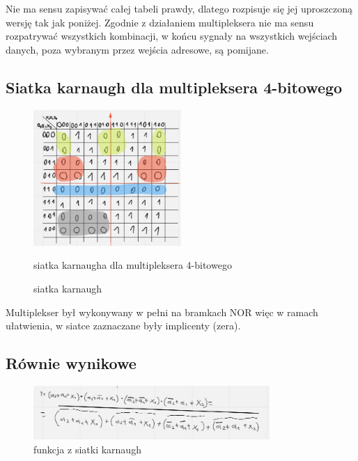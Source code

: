 Nie ma sensu zapisywać całej tabeli prawdy, dlatego rozpisuje się jej uproszczoną wersję tak jak poniżej. Zgodnie z działaniem multipleksera nie ma sensu rozpatrywać wszystkich kombinacji, w końcu sygnały na wszystkich wejściach danych, poza wybranym przez wejścia adresowe, są pomijane.

\newpage

\subsection{Siatka karnaugh dla multipleksera 4-bitowego}

\begin{figure}[h!]
    \centering
    \includegraphics[width = 0.5\textwidth]{images/mux/mux_k.png}
    \caption{siatka karnaugha dla multipleksera 4-bitowego}
    \caption{siatka karnaugh}
    \label{fig:my_label}
\end{figure} 

Multiplekser był wykonywany w pełni na bramkach NOR więc w ramach ułatwienia, w siatce zaznaczane były implicenty (zera).

\subsection{Równie wynikowe}

\begin{figure}[h!]
    \centering
    \includegraphics[width = 0.8\textwidth]{images/mux/mux_e.png}
    \caption{funkcja z siatki karnaugh}
    \label{fig:my_label}
\end{figure}

\newpage

